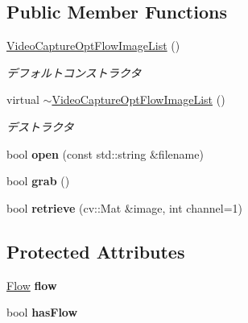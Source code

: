 \subsection*{Public Member Functions}
\begin{DoxyCompactItemize}
\item 
\hypertarget{classskl_1_1_video_capture_opt_flow_image_list_a36b0491c64fd43719187d2ac52336949}{}\label{classskl_1_1_video_capture_opt_flow_image_list_a36b0491c64fd43719187d2ac52336949} 
\hyperlink{classskl_1_1_video_capture_opt_flow_image_list_a36b0491c64fd43719187d2ac52336949}{Video\+Capture\+Opt\+Flow\+Image\+List} ()
\begin{DoxyCompactList}\small\item\em デフォルトコンストラクタ \end{DoxyCompactList}\item 
\hypertarget{classskl_1_1_video_capture_opt_flow_image_list_aea727356fa14b01db10452bc72600fd2}{}\label{classskl_1_1_video_capture_opt_flow_image_list_aea727356fa14b01db10452bc72600fd2} 
virtual \hyperlink{classskl_1_1_video_capture_opt_flow_image_list_aea727356fa14b01db10452bc72600fd2}{$\sim$\+Video\+Capture\+Opt\+Flow\+Image\+List} ()
\begin{DoxyCompactList}\small\item\em デストラクタ \end{DoxyCompactList}\item 
\hypertarget{classskl_1_1_video_capture_opt_flow_image_list_afdf96b1882e6da453316a6af28ef3a96}{}\label{classskl_1_1_video_capture_opt_flow_image_list_afdf96b1882e6da453316a6af28ef3a96} 
bool {\bfseries open} (const std\+::string \&filename)
\item 
\hypertarget{classskl_1_1_video_capture_opt_flow_image_list_a71e22f4c62b46802043d57ecd37afc03}{}\label{classskl_1_1_video_capture_opt_flow_image_list_a71e22f4c62b46802043d57ecd37afc03} 
bool {\bfseries grab} ()
\item 
\hypertarget{classskl_1_1_video_capture_opt_flow_image_list_aa4123850509f5dd63feb04e6309c207c}{}\label{classskl_1_1_video_capture_opt_flow_image_list_aa4123850509f5dd63feb04e6309c207c} 
bool {\bfseries retrieve} (cv\+::\+Mat \&image, int channel=1)
\end{DoxyCompactItemize}
\subsection*{Protected Attributes}
\begin{DoxyCompactItemize}
\item 
\hypertarget{classskl_1_1_video_capture_opt_flow_image_list_a74e6b99f2dbdd7ae12fe78e4c4bb2a6e}{}\label{classskl_1_1_video_capture_opt_flow_image_list_a74e6b99f2dbdd7ae12fe78e4c4bb2a6e} 
\hyperlink{classskl_1_1_flow}{Flow} {\bfseries flow}
\item 
\hypertarget{classskl_1_1_video_capture_opt_flow_image_list_ace9bb1949e08282fdb0e3a153e8329b2}{}\label{classskl_1_1_video_capture_opt_flow_image_list_ace9bb1949e08282fdb0e3a153e8329b2} 
bool {\bfseries has\+Flow}
\end{DoxyCompactItemize}
